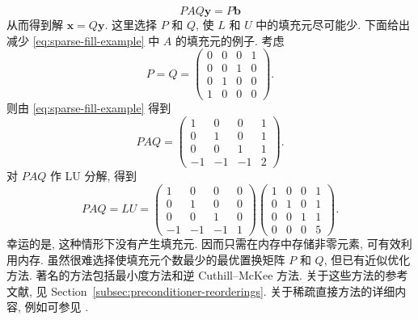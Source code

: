 \[PAQ\bm y=P\bm b\]
{从而得到解 $\bm x=Q\bm y$. 这里选择 $P$ 和 $Q$, 使 $L$ 和 $U$ 中的填充元尽可能少.}
{下面给出减少 \eqref{eq:sparse-fill-example} 中 $A$ 的填充元的例子. 考虑}
\[
P=Q=\begin{pmatrix}0&0&0&1\\0&0&1&0\\0&1&0&0\\1&0&0&0\end{pmatrix}.
\]
{则由 \eqref{eq:sparse-fill-example} 得到}
\[
PAQ=\begin{pmatrix}1&0&0&1\\0&1&0&1\\0&0&1&1\\-1&-1&-1&2\end{pmatrix}.
\]
{对 $PAQ$ 作 LU 分解, 得到}
\[
PAQ=LU=\begin{pmatrix}1&0&0&0\\0&1&0&0\\0&0&1&0\\-1&-1&-1&1\end{pmatrix}
\begin{pmatrix}1&0&0&1\\0&1&0&1\\0&0&1&1\\0&0&0&5\end{pmatrix}.
\]
{幸运的是, 这种情形下没有产生填充元. 因而只需在内存中存储非零元素, 可有效利用内存.}
{虽然很难选择使填充元个数最少的最优置换矩阵 $P$ 和 $Q$, 但已有近似优化方法. 著名的方法包括最小度方法和逆 Cuthill--McKee 方法. 关于这些方法的参考文献, 见 Section~\ref{subsec:preconditioner-reorderings}. 关于稀疏直接方法的详细内容, 例如可参见 .}

